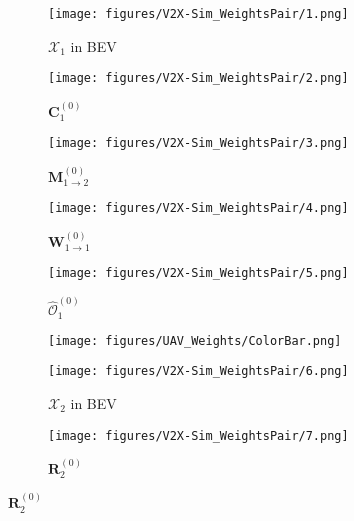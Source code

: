\documentclass{article}
\begin{document}
\begin{figure}[!t]
  \centering
\begin{subfigure}{0.18\linewidth}
    \texttt{[image: figures/V2X-Sim\_WeightsPair/1.png]}
    \vspace{-5mm}
    \caption{$\mathcal{X}_1$ in BEV}
    \label{fig:UAV_BEVImage1}
  \end{subfigure}
\begin{subfigure}{0.18\linewidth}
    \texttt{[image: figures/V2X-Sim\_WeightsPair/2.png]}
    \vspace{-5mm}
    \caption{$\mathbf{C}_1^{(0)}$}
    \label{fig:UAV_ConfMap1}
  \end{subfigure}
  \begin{subfigure}{0.18\linewidth}
    \texttt{[image: figures/V2X-Sim\_WeightsPair/3.png]}
    \vspace{-5mm}
    \caption{$\mathbf{M}_{1\rightarrow 2}^{(0)}$}
    \label{fig:UAV_SelectMat1}
  \end{subfigure}
  \begin{subfigure}{0.18\linewidth}
    \texttt{[image: figures/V2X-Sim\_WeightsPair/4.png]}
    \vspace{-5mm}
    \caption{$\mathbf{W}_{1\rightarrow 1}^{(0)}$}
    \label{fig:UAV_AttenWeight1to1}
  \end{subfigure}
\begin{subfigure}{0.18\linewidth}
    \texttt{[image: figures/V2X-Sim\_WeightsPair/5.png]}
    \vspace{-5mm}
    \caption{$\widehat{\mathcal{O}}_{1}^{(0)}$}
    \label{fig:UAV_DetectionBeforeComm}
  \end{subfigure}
  \begin{subfigure}{0.06\linewidth}
    \texttt{[image: figures/UAV\_Weights/ColorBar.png]}
\end{subfigure}
  \centering
  \begin{subfigure}{0.18\linewidth}
    \texttt{[image: figures/V2X-Sim\_WeightsPair/6.png]}
    \vspace{-5mm}
    \caption{$\mathcal{X}_2$ in BEV}
    \label{fig:UAV_BEVImage2}
  \end{subfigure}
\begin{subfigure}{0.18\linewidth}
    \texttt{[image: figures/V2X-Sim\_WeightsPair/7.png]}
    \vspace{-5mm}
    \caption{$\mathbf{R}_2^{(0)}$}

\end{subfigure}
\end{figure}
\end{document}
